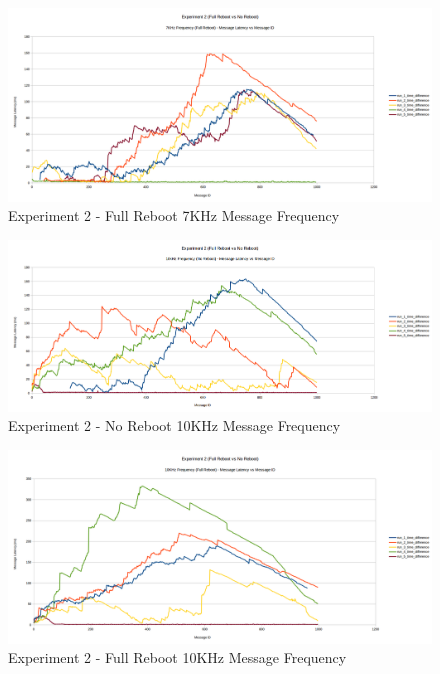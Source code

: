 \documentclass{l4proj}
\begin{document}
\begin{appendices}
\begin{figure}
\centering
\includegraphics[width=\textwidth]{images/full-reboot-7khz.png}
\caption{Experiment 2 - Full Reboot 7KHz Message Frequency}
\label{exp2-fullreboot-7khz}
\end{figure}

\begin{figure}
\centering
\includegraphics[width=\textwidth]{images/no-reboot-10khz.png}
\caption{Experiment 2 - No Reboot 10KHz Message Frequency}
\label{exp2-noreboot-10khz}
\end{figure}

\begin{figure}
\centering
\includegraphics[width=\textwidth]{images/full-reboot-10khz.png}
\caption{Experiment 2 - Full Reboot 10KHz Message Frequency}
\label{exp2-fullreboot-10khz}
\end{figure}
\fi

\end{appendices}




\end{document}
